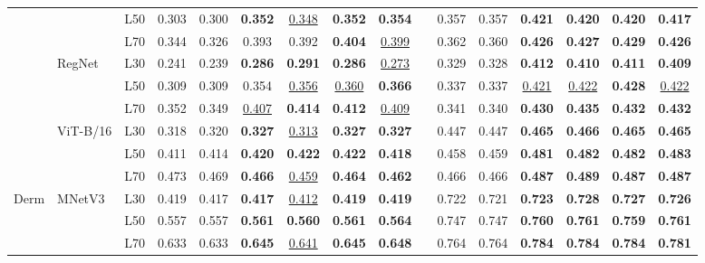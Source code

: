 \begin{table}[t]
{\begin{tabular}{lll cccccc |c cccccc}
 &  & L50 & 0.303 & 0.300 & \textbf{0.352} & \underline{0.348} & \textbf{0.352} & \textbf{0.354} & & 0.357 & 0.357 & \textbf{0.421} & \textbf{0.420} & \textbf{0.420} & \textbf{0.417} \\
 &  & L70 & 0.344 & 0.326 & 0.393 & 0.392 & \textbf{0.404} & \underline{0.399} & & 0.362 & 0.360 & \textbf{0.426} & \textbf{0.427} & \textbf{0.429} & \textbf{0.426} \\
\cmidrule(lr){2-16}
 & \multirow{3}{*}{RegNet} & L30 & 0.241 & 0.239 & \textbf{0.286} & \textbf{0.291} & \textbf{0.286} & \underline{0.273} & & 0.329 & 0.328 & \textbf{0.412} & \textbf{0.410} & \textbf{0.411} & \textbf{0.409} \\
 &  & L50 & 0.309 & 0.309 & 0.354 & \underline{0.356} & \underline{0.360} & \textbf{0.366} & & 0.337 & 0.337 & \underline{0.421} & \underline{0.422} & \textbf{0.428} & \underline{0.422} \\
 &  & L70 & 0.352 & 0.349 & \underline{0.407} & \textbf{0.414} & \textbf{0.412} & \underline{0.409} & & 0.341 & 0.340 & \textbf{0.430} & \textbf{0.435} & \textbf{0.432} & \textbf{0.432} \\
\cmidrule(lr){2-16}
 & \multirow{3}{*}{ViT-B/16} & L30 & 0.318 & 0.320 & \textbf{0.327} & \underline{0.313} & \textbf{0.327} & \textbf{0.327} & & 0.447 & 0.447 & \textbf{0.465} & \textbf{0.466} & \textbf{0.465} & \textbf{0.465} \\
 &  & L50 & 0.411 & 0.414 & \textbf{0.420} & \textbf{0.422} & \textbf{0.422} & \textbf{0.418} & & 0.458 & 0.459 & \textbf{0.481} & \textbf{0.482} & \textbf{0.482} & \textbf{0.483} \\
 &  & L70 & 0.473 & 0.469 & \textbf{0.466} & \underline{0.459} & \textbf{0.464} & \textbf{0.462} & & 0.466 & 0.466 & \textbf{0.487} & \textbf{0.489} & \textbf{0.487} & \textbf{0.487} \\
\midrule
\multirow{9}{*}{Derm} & \multirow{3}{*}{MNetV3} & L30 & 0.419 & 0.417 & \textbf{0.417} & \underline{0.412} & \textbf{0.419} & \textbf{0.419} & & 0.722 & 0.721 & \textbf{0.723} & \textbf{0.728} & \textbf{0.727} & \textbf{0.726} \\
 &  & L50 & 0.557 & 0.557 & \textbf{0.561} & \textbf{0.560} & \textbf{0.561} & \textbf{0.564} & & 0.747 & 0.747 & \textbf{0.760} & \textbf{0.761} & \textbf{0.759} & \textbf{0.761} \\
 &  & L70 & 0.633 & 0.633 & \textbf{0.645} & \underline{0.641} & \textbf{0.645} & \textbf{0.648} & & 0.764 & 0.764 & \textbf{0.784} & \textbf{0.784} & \textbf{0.784} & \textbf{0.781} \\

\end{tabular}}
\end{table}
